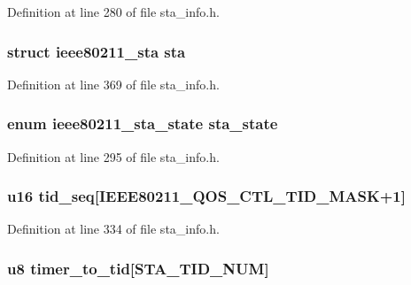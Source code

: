 Definition at line 280 of file sta\-\_\-info.\-h.

\hypertarget{structsta__info_a10bf230d5f2e241e9de2a67c2da53d4e}{
\subsubsection[{sta}]{\setlength{\rightskip}{0pt plus 5cm}struct ieee80211\-\_\-sta sta}}\label{structsta__info_a10bf230d5f2e241e9de2a67c2da53d4e}


Definition at line 369 of file sta\-\_\-info.\-h.

\hypertarget{structsta__info_a0bb9a8b1f52f5d772f02e2421c893545}{
\subsubsection[{sta\-\_\-state}]{\setlength{\rightskip}{0pt plus 5cm}enum ieee80211\-\_\-sta\-\_\-state sta\-\_\-state}}\label{structsta__info_a0bb9a8b1f52f5d772f02e2421c893545}


Definition at line 295 of file sta\-\_\-info.\-h.

\hypertarget{structsta__info_a51a374321b9b3f2f41ec59ed2dc0eca9}{
\subsubsection[{tid\-\_\-seq}]{\setlength{\rightskip}{0pt plus 5cm}u16 tid\-\_\-seq\mbox{[}I\-E\-E\-E80211\-\_\-\-Q\-O\-S\-\_\-\-C\-T\-L\-\_\-\-T\-I\-D\-\_\-\-M\-A\-S\-K+1\mbox{]}}}\label{structsta__info_a51a374321b9b3f2f41ec59ed2dc0eca9}


Definition at line 334 of file sta\-\_\-info.\-h.

\hypertarget{structsta__info_ab892eac21bd848831f225404459d91ff}{
\subsubsection[{timer\-\_\-to\-\_\-tid}]{\setlength{\rightskip}{0pt plus 5cm}u8 timer\-\_\-to\-\_\-tid\mbox{[}{\bf S\-T\-A\-\_\-\-T\-I\-D\-\_\-\-N\-U\-M}\mbox{]}}}\label{structsta__info_ab892eac21bd848831f225404459d91ff}


